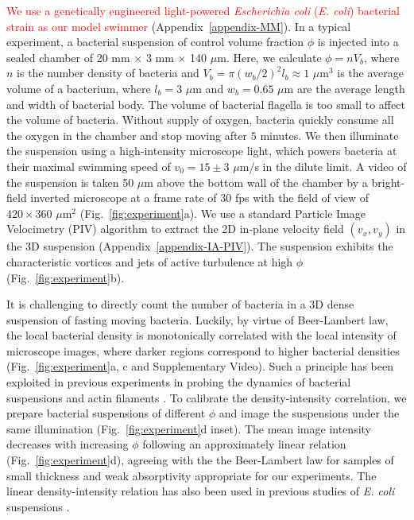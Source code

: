 \documentclass[twocolumn,aps,prx,amsmath,amssymb,longbibliography,superscriptaddress]{revtex4-2}
\begin{document}
\textcolor{red}{We use a genetically engineered light-powered \textit{Escherichia coli} (\textit{E. coli}) bacterial strain as our model swimmer} (Appendix~\ref{appendix-MM}).
In a typical experiment, a bacterial suspension of control volume fraction $\phi$ is injected into a sealed chamber of 20 mm $\times$ 3 mm $\times$ 140 $\mu$m. Here, we calculate $\phi = n V_b$, where $n$ is the number density of bacteria and $V_b = \pi (w_b/2)^2 l_b \approx 1$ $\mu$m$^3$ is the average volume of a bacterium, where $l_b = 3$ $\mu$m and $w_b = 0.65$ $\mu$m are the average length and width of bacterial body. The volume of bacterial flagella is too small to affect the volume of bacteria.
Without supply of oxygen, bacteria quickly consume all the oxygen in the chamber and stop moving after $5$ minutes.
We then illuminate the suspension using a high-intensity microscope light, which powers bacteria at their maximal swimming speed of $v_0 = 15 \pm 3$ $\mu$m/s in the dilute limit.
A video of the suspension is taken 50 $\mu$m above the bottom wall of the chamber by a bright-field inverted microscope at a frame rate of $30$ fps with the field of view of $420 \times 360$ $\mu$m$^2$ (Fig.~\ref{fig:experiment}a).
We use a standard Particle Image Velocimetry (PIV) algorithm
to extract the 2D in-plane velocity field $(v_x,v_y)$ in the 3D suspension (Appendix~\ref{appendix-IA-PIV}). The suspension exhibits the characteristic vortices and jets of active turbulence at high $\phi$ (Fig.~\ref{fig:experiment}b).

It is challenging to directly count the number of bacteria in a 3D dense suspension of fasting moving bacteria. Luckily, by virtue of Beer-Lambert law, the local bacterial density is monotonically correlated with the local intensity of microscope images, where darker regions correspond to higher bacterial densities (Fig.~\ref{fig:experiment}a, c and Supplementary Video). Such a principle has been exploited in previous experiments in probing the dynamics of bacterial suspensions and actin filaments \cite{Sokolov2009, Wilson2011, Schaller2013}. To calibrate the density-intensity correlation, we prepare bacterial suspensions of different $\phi$ and image the suspensions under the same illumination (Fig.~\ref{fig:experiment}d inset). The mean image intensity decreases with increasing $\phi$ following an approximately linear relation (Fig.~\ref{fig:experiment}d), agreeing with the the Beer-Lambert law for samples of small thickness and weak absorptivity appropriate for our experiments. The linear density-intensity relation has also been used in previous studies of \textit{E. coli} suspensions \cite{Wilson2011}.
\end{document}
